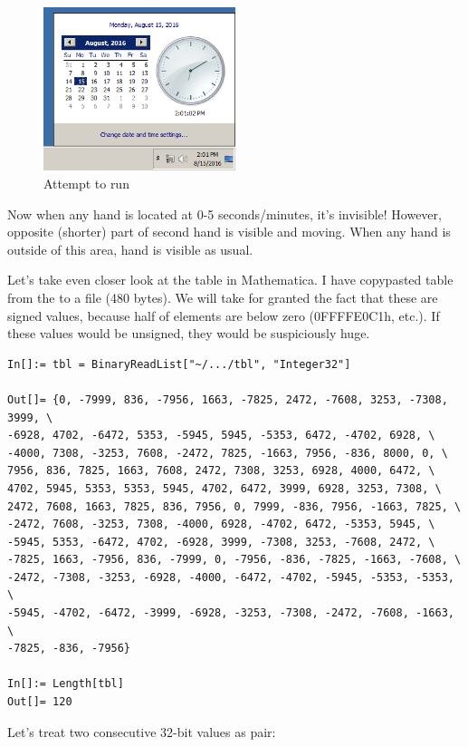 \begin{figure}[H]
\centering
\includegraphics[width=0.5\textwidth]{examples/timedate/6_pairs_zeroed.png}
\caption{Attempt to run}
\end{figure}

Now when any hand is located at 0-5 seconds/minutes, it's invisible! However, opposite (shorter) part of second hand
is visible and moving.
When any hand is outside of this area, hand is visible as usual.

Let's take even closer look at the table in Mathematica.
I have copypasted table from the  to a  file (480 bytes).
We will take for granted the fact that these are signed values, because half of elements are below zero (0FFFFE0C1h, etc.).
If these values would be unsigned, they would be suspiciously huge.

\begin{lstlisting}
In[]:= tbl = BinaryReadList["~/.../tbl", "Integer32"]

Out[]= {0, -7999, 836, -7956, 1663, -7825, 2472, -7608, 3253, -7308, 3999, \
-6928, 4702, -6472, 5353, -5945, 5945, -5353, 6472, -4702, 6928, \
-4000, 7308, -3253, 7608, -2472, 7825, -1663, 7956, -836, 8000, 0, \
7956, 836, 7825, 1663, 7608, 2472, 7308, 3253, 6928, 4000, 6472, \
4702, 5945, 5353, 5353, 5945, 4702, 6472, 3999, 6928, 3253, 7308, \
2472, 7608, 1663, 7825, 836, 7956, 0, 7999, -836, 7956, -1663, 7825, \
-2472, 7608, -3253, 7308, -4000, 6928, -4702, 6472, -5353, 5945, \
-5945, 5353, -6472, 4702, -6928, 3999, -7308, 3253, -7608, 2472, \
-7825, 1663, -7956, 836, -7999, 0, -7956, -836, -7825, -1663, -7608, \
-2472, -7308, -3253, -6928, -4000, -6472, -4702, -5945, -5353, -5353, \
-5945, -4702, -6472, -3999, -6928, -3253, -7308, -2472, -7608, -1663, \
-7825, -836, -7956}

In[]:= Length[tbl]
Out[]= 120
\end{lstlisting}

Let's treat two consecutive 32-bit values as pair:

